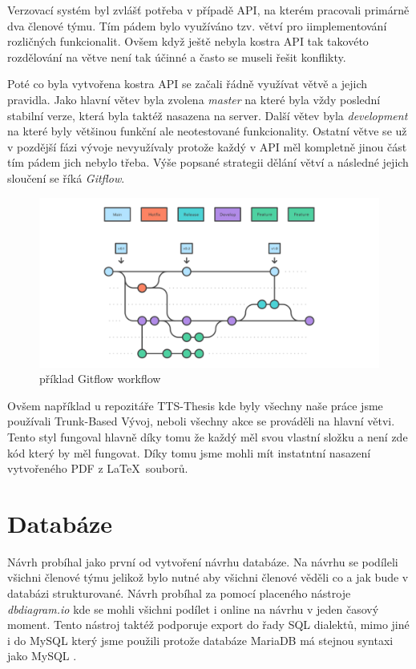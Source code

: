 Verzovací systém byl zvlášť potřeba v případě API, na kterém pracovali primárně dva členové týmu. Tím pádem bylo využíváno tzv. větví pro iimplementování rozličných funkcionalit. Ovšem když ještě nebyla kostra API tak takovéto rozdělování na větve není tak účinné a často se museli řešit konflikty. 

Poté co byla vytvořena kostra API se začali řádně využívat větvě a jejich pravidla. Jako hlavní větev byla zvolena \textit{master} na které byla vždy poslední stabilní verze, která byla taktéž nasazena na server. Další větev byla \textit{development} na které byly většinou funkční ale neotestované funkcionality. Ostatní větve se už v pozdější fázi vývoje nevyužívaly protože každý v API měl kompletně jinou část tím pádem jich nebylo třeba.
Výše popsané strategii dělání větví a následné jejich sloučení se říká \textit{Gitflow}.

\begin{figure}[H]
    \centering
    \includegraphics[width=\textwidth]{figures/impl/git-flow.png}
    \caption{příklad Gitflow workflow}
    \label{fig:gitflow}
\end{figure}



Ovšem například u repozitáře TTS-Thesis kde byly všechny naše práce jsme používali Trunk-Based Vývoj, neboli všechny akce se prováděli na hlavní větvi. Tento styl fungoval hlavně díky tomu že každý měl svou vlastní složku a není zde kód který by měl fungovat. Díky tomu jsme mohli mít instatntní nasazení vytvořeného PDF z \LaTeX ~souborů.

\section{Databáze}\label{sec:database}
Návrh probíhal jako první od vytvoření návrhu databáze. Na návrhu se podíleli všichni členové týmu  jelikož bylo nutné aby všichni členové věděli co a jak bude v databázi strukturované. Návrh probíhal za pomocí placeného nástroje \textit{dbdiagram.io} kde se mohli všichni podílet i online na návrhu v jeden časový moment. Tento nástroj taktéž podporuje export do řady SQL dialektů, mimo jiné i do MySQL který jsme použili protože databáze MariaDB má stejnou syntaxi jako MySQL . 

